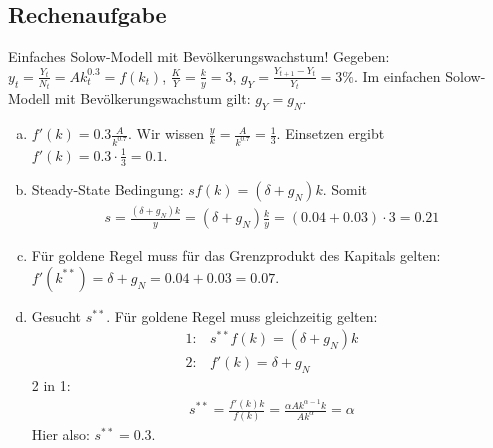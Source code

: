 \documentclass{scrartcl}
\begin{document}
\subsection{Rechenaufgabe}
Einfaches Solow-Modell mit Bev\"{o}lkerungswachstum! Gegeben:\\
$y_t = \frac{Y_t}{N_t} = A k_t^{0.3} = f(k_t)$, $\frac{K}{Y}=\frac{k}{y}=3$, $g_Y=\frac{Y_{t+1}-Y_t}{Y_t} = 3\%$. Im einfachen Solow-Modell mit Bev\"{o}lkerungswachstum gilt: $g_Y=g_N$.
\begin{enumerate}[a)]
  \item $f'(k) = 0.3 \frac{A}{k^{0.7}}$. Wir wissen $\frac{y}{k}=\frac{A}{k^{0.7}} = \frac{1}{3}$. Einsetzen ergibt $f'(k) = 0.3\cdot \frac{1}{3} = 0.1.$
  \item Steady-State Bedingung: $sf(k)=(\delta + g_N)k$. Somit
  \begin{align*}
    s = \frac{(\delta+g_N)k}{y} = (\delta+g_N) \frac{k}{y} = (0.04+0.03)\cdot 3 = 0.21
  \end{align*}
  \item F\"{u}r goldene Regel muss f\"{u}r das Grenzprodukt des Kapitals gelten: $f'(k^{**})=\delta+g_N = 0.04+0.03 = 0.07$.
  \item Gesucht $s^{**}$. F\"{u}r goldene Regel muss gleichzeitig gelten:
  \begin{align*}
    1:& s^{**} f(k) = (\delta + g_N)k\\
    2:& f'(k) = \delta + g_N
  \end{align*}
  2 in 1:
  \begin{align*}
    s^{**} = \frac{f'(k)k}{f(k)} = \frac{\alpha A k^{\alpha-1}k}{Ak^\alpha} = \alpha
  \end{align*}
  Hier also: $s^{**} = 0.3$.
\end{enumerate}
\end{document}
